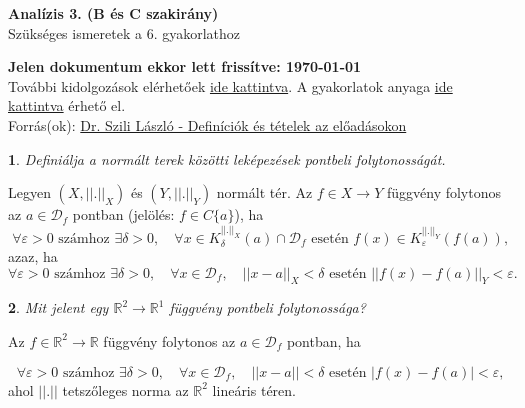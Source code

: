 \documentclass[a4paper]{article}
\def\R{\mathbb{R}}
\theoremstyle{qstyle}
\newtheorem{question}{}{}
\begin{document}
	\begin{center}
		{\Large\textbf{Analízis 3. (B és C szakirány)}}\\
		{\Large Szükséges ismeretek a 6. gyakorlathoz}
	\end{center}
	
	\begin{framed}
		\textbf{Jelen dokumentum ekkor lett frissítve: {\yyyymmdddate\today} \ \currenttime}\\
		További kidolgozások elérhetőek \href{https://people.inf.elte.hu/totadavid95/Analizis3/2019-tavasz/}{ide kattintva}. A gyakorlatok anyaga \href{http://numanal.inf.elte.hu/~szili/Oktatas/An3_BC_szakirany_2019/An3_BC_gyak_2019_tavasz.pdf}{ide kattintva} érhető el.\\	
		Forrás(ok): \href{http://numanal.inf.elte.hu/~szili/Oktatas/An3_BC_szakirany_2019/An3_BC_ea_def_tetel_2019_tavasz.pdf}{Dr. Szili László - Definíciók és tételek az előadásokon}
	\end{framed}
	
	\begin{question}
		Definiálja a normált terek közötti leképezések pontbeli folytonosságát.
	\end{question}
	Legyen $(X,||.||_X)$ és $(Y,||.||_Y)$ normált tér. Az $f\in X\to Y$ függvény folytonos az $a\in \mathcal{D}_f$ pontban (jelölés: $f\in C\{a\}$), ha
	$$\forall \varepsilon > 0 \text{ számhoz } \exists \delta > 0, \quad \forall x \in K_{\delta}^{||.||_X}(a) \cap \mathcal{D}_f \text{ esetén } f(x)\in K_{\varepsilon}^{||.||_Y}(f(a)) \text{,}$$
	azaz, ha
	$$\forall \varepsilon > 0 \text{ számhoz } \exists \delta > 0, \quad \forall x \in \mathcal{D}_f, \quad ||x-a||_X < \delta \text{ esetén } ||f(x)-f(a)||_Y < \varepsilon \text{.}$$


	\begin{question}
		Mit jelent egy $\R^2\to\R^1$ függvény pontbeli folytonossága?
	\end{question}
	Az $f\in\R^2\to\R$ függvény folytonos az $a\in\mathcal{D}_f$ pontban, ha
	
	$$\forall \varepsilon > 0 \text{ számhoz } \exists \delta > 0, \quad \forall x \in \mathcal{D}_f, \quad ||x-a|| < \delta \text{ esetén } |f(x)-f(a)| < \varepsilon \text{,}$$
	ahol $||.||$ tetszőleges norma az $\R^2$ lineáris téren.
	
\end{document}
